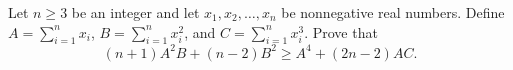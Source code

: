 Let \(n \geq 3\) be an integer and let \(x_1, x_2, \dots, x_n\) be nonnegative real numbers.
Define \(A = \sum_{i=1}^n x_i\), \(B = \sum_{i=1}^n x_i^2\), and \(C = \sum_{i=1}^n x_i^3\).
Prove that \[(n+1)A^2B + (n-2)B^2 \geq A^4 + (2n-2)AC.\]

